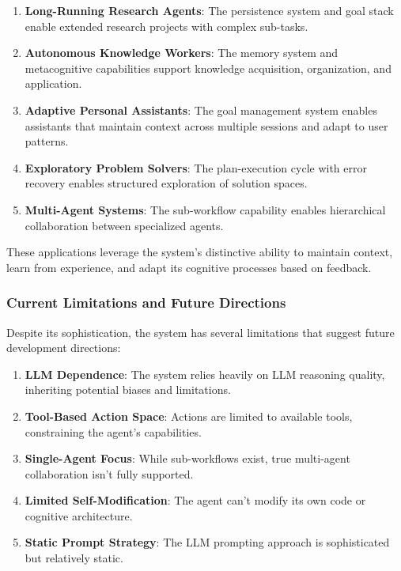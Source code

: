 \documentclass[12pt,a4paper]{article}
\begin{document}
\begin{enumerate}[label=\arabic*.]
    \item \textbf{Long-Running Research Agents}: The persistence system and goal stack enable extended research projects with complex sub-tasks.
    \item \textbf{Autonomous Knowledge Workers}: The memory system and metacognitive capabilities support knowledge acquisition, organization, and application.
    \item \textbf{Adaptive Personal Assistants}: The goal management system enables assistants that maintain context across multiple sessions and adapt to user patterns.
    \item \textbf{Exploratory Problem Solvers}: The plan-execution cycle with error recovery enables structured exploration of solution spaces.
    \item \textbf{Multi-Agent Systems}: The sub-workflow capability enables hierarchical collaboration between specialized agents.
\end{enumerate}

These applications leverage the system's distinctive ability to maintain context, learn from experience, and adapt its cognitive processes based on feedback.

\subsubsection*{Current Limitations and Future Directions}

Despite its sophistication, the system has several limitations that suggest future development directions:

\begin{enumerate}[label=\arabic*.]
    \item \textbf{LLM Dependence}: The system relies heavily on LLM reasoning quality, inheriting potential biases and limitations.
    \item \textbf{Tool-Based Action Space}: Actions are limited to available tools, constraining the agent's capabilities.
    \item \textbf{Single-Agent Focus}: While sub-workflows exist, true multi-agent collaboration isn't fully supported.
    \item \textbf{Limited Self-Modification}: The agent can't modify its own code or cognitive architecture.
    \item \textbf{Static Prompt Strategy}: The LLM prompting approach is sophisticated but relatively static.
\end{enumerate}
\end{document}
